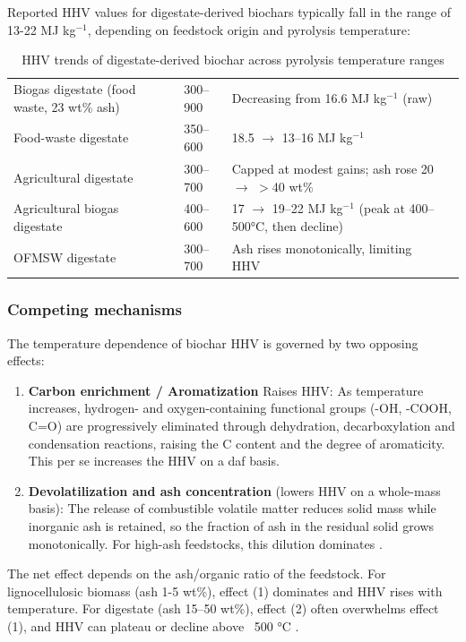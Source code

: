 Reported HHV values for digestate-derived biochars typically fall in the range of 13-22 MJ kg$^{-1}$, depending on feedstock origin and pyrolysis temperature:
\begin{table}[H]
\centering
\caption{HHV trends of digestate-derived biochar across pyrolysis temperature ranges}
\label{tab:hhv_digestate_comparison}
\begin{tabular}{L{3.5cm} L{2cm} L{6cm} L{3cm}}
\toprule
{} &  &  &  \\
\midrule
Biogas digestate (food waste, 23 wt\% ash) & 300--900 & Decreasing from 16.6 MJ kg$^{-1}$ (raw) & \textcite{hung-2017} \\ \addlinespace
Food-waste digestate & 350--600 & 18.5 $\rightarrow$ 13--16 MJ kg$^{-1}$ & \textcite{opatokun-2015} \\ \addlinespace
Agricultural digestate & 300--700 & Capped at modest gains; ash rose 20 $\rightarrow$ $>$40 wt\% & \textcite{pecchi-2019} \\ \addlinespace
Agricultural biogas digestate & 400--600 & 17 $\rightarrow$ 19--22 MJ kg$^{-1}$ (peak at 400--500°C, then decline) & \textcite{kujawska-2026} \\ \addlinespace
OFMSW digestate & 300--700 & Ash rises monotonically, limiting HHV & \textcite{alghashm-2023} \\
\bottomrule
\end{tabular}
\end{table}

\subsubsection*{Competing mechanisms}
The temperature dependence of biochar HHV is governed by two opposing effects:
\begin{enumerate}
    \item \textbf{Carbon enrichment / Aromatization} Raises HHV: As temperature increases, hydrogen- and oxygen-containing functional groups (-OH, -COOH, C=O) are progressively eliminated through dehydration, decarboxylation and condensation reactions, raising the C content and the degree of aromaticity. This per se increases the HHV on a daf basis.
    \item \textbf{Devolatilization and ash concentration} (lowers HHV on a whole-mass basis): The release of combustible volatile matter reduces solid mass while inorganic ash is retained, so the fraction of ash in the residual solid grows monotonically. For high-ash feedstocks, this dilution dominates \cite{alghashm-2023}.
\end{enumerate}
The net effect depends on the ash/organic ratio of the feedstock. For lignocellulosic biomass (ash 1-5 wt\%), effect (1) dominates and HHV rises with temperature. For digestate (ash 15–50 wt\%), effect (2) often overwhelms effect (1), and HHV can plateau or decline above ~500 °C \cite{Lehmann2015,antal-2003}.

